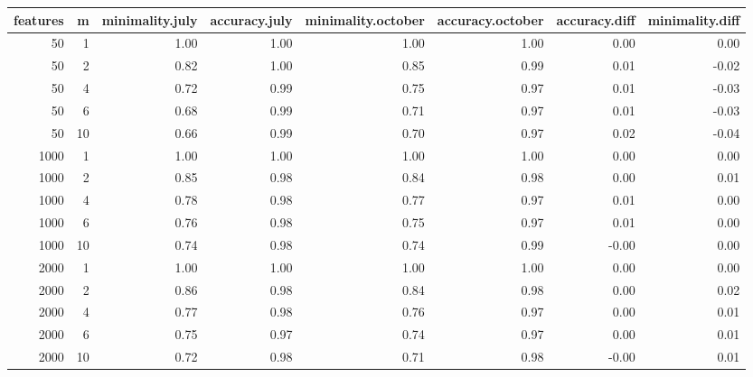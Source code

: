 \begin{table}[ht]
\centering
\begin{tabular}{rrrrrrrr}
  \hline
features & m & minimality.july & accuracy.july & minimality.october & accuracy.october & accuracy.diff & minimality.diff \\ 
  \hline
 50 &   1 & 1.00 & 1.00 & 1.00 & 1.00 & 0.00 & 0.00 \\ 
   50 &   2 & 0.82 & 1.00 & 0.85 & 0.99 & 0.01 & -0.02 \\ 
   50 &   4 & 0.72 & 0.99 & 0.75 & 0.97 & 0.01 & -0.03 \\ 
   50 &   6 & 0.68 & 0.99 & 0.71 & 0.97 & 0.01 & -0.03 \\ 
   50 &  10 & 0.66 & 0.99 & 0.70 & 0.97 & 0.02 & -0.04 \\ 
  1000 &   1 & 1.00 & 1.00 & 1.00 & 1.00 & 0.00 & 0.00 \\ 
  1000 &   2 & 0.85 & 0.98 & 0.84 & 0.98 & 0.00 & 0.01 \\ 
  1000 &   4 & 0.78 & 0.98 & 0.77 & 0.97 & 0.01 & 0.00 \\ 
  1000 &   6 & 0.76 & 0.98 & 0.75 & 0.97 & 0.01 & 0.00 \\ 
  1000 &  10 & 0.74 & 0.98 & 0.74 & 0.99 & -0.00 & 0.00 \\ 
  2000 &   1 & 1.00 & 1.00 & 1.00 & 1.00 & 0.00 & 0.00 \\ 
  2000 &   2 & 0.86 & 0.98 & 0.84 & 0.98 & 0.00 & 0.02 \\ 
  2000 &   4 & 0.77 & 0.98 & 0.76 & 0.97 & 0.00 & 0.01 \\ 
  2000 &   6 & 0.75 & 0.97 & 0.74 & 0.97 & 0.00 & 0.01 \\ 
  2000 &  10 & 0.72 & 0.98 & 0.71 & 0.98 & -0.00 & 0.01 \\ 
   \hline
\end{tabular}
\end{table}
